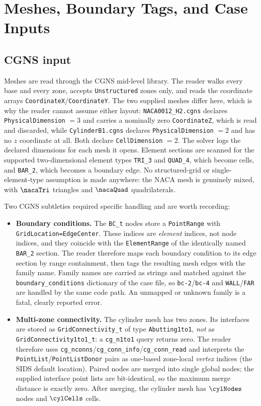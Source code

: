 \section{Meshes, Boundary Tags, and Case Inputs}
\label{sec:mesh}

\subsection{CGNS input}

Meshes are read through the CGNS mid-level library. The reader walks every base
and every zone, accepts \texttt{Unstructured} zones only, and reads the
coordinate arrays \texttt{CoordinateX}/\texttt{CoordinateY}. The two supplied meshes
differ here, which is why the reader cannot assume either layout:
\texttt{NACA0012\_H2.cgns} declares \texttt{PhysicalDimension} $=3$ and carries a
nominally zero \texttt{CoordinateZ}, which is read and discarded, while
\texttt{CylinderB1.cgns} declares \texttt{PhysicalDimension} $=2$ and has no $z$
coordinate at all. Both declare \texttt{CellDimension} $=2$. The solver logs the
declared dimensions for each mesh it opens. Element sections are scanned
for the supported two-dimensional element types \texttt{TRI\_3} and
\texttt{QUAD\_4}, which become cells, and \texttt{BAR\_2}, which becomes a
boundary edge. No structured-grid or single-element-type assumption is made
anywhere: the NACA mesh is genuinely mixed, with $\nacaTri$ triangles and
$\nacaQuad$ quadrilaterals.

Two CGNS subtleties required specific handling and are worth recording:

\begin{itemize}
  \item \textbf{Boundary conditions.} The \texttt{BC\_t} nodes store a
  \texttt{PointRange} with \texttt{GridLocation=EdgeCenter}. These indices are
  \emph{element} indices, not node indices, and they coincide with the
  \texttt{ElementRange} of the identically named \texttt{BAR\_2} section. The
  reader therefore maps each boundary condition to its edge section by range
  containment, then tags the resulting mesh edges with the family name. Family
  names are carried as strings and matched against the
  \texttt{boundary\_conditions} dictionary of the case file, so
  \texttt{bc-2}/\texttt{bc-4} and \texttt{WALL}/\texttt{FAR} are handled by the
  same code path. An unmapped or unknown family is a fatal, clearly reported
  error.
  \item \textbf{Multi-zone connectivity.} The cylinder mesh has two zones. Its
  interfaces are stored as \texttt{GridConnectivity\_t} of type
  \texttt{Abutting1to1}, \emph{not} as \texttt{GridConnectivity1to1\_t}: a
  \texttt{cg\_n1to1} query returns zero. The reader therefore uses
  \texttt{cg\_nconns}/\texttt{cg\_conn\_info}/\texttt{cg\_conn\_read} and
  interprets the \texttt{PointList}/\texttt{PointListDonor} pairs as one-based
  zone-local \emph{vertex} indices (the SIDS default location). Paired nodes are
  merged into single global nodes; the supplied interface point lists are
  bit-identical, so the maximum merge distance is exactly zero. After merging,
  the cylinder mesh has $\cylNodes$ nodes and $\cylCells$ cells.
\end{itemize}

